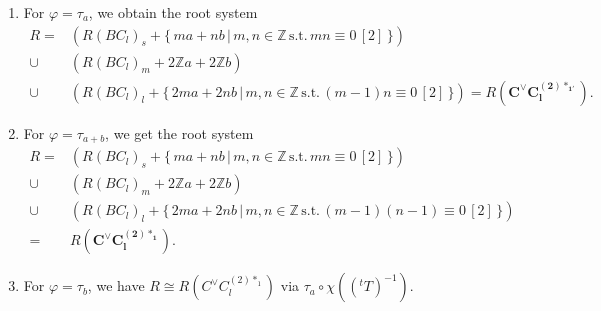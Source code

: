\documentclass[11pt]{amsart}
\newcommand{\Z}{\mathbb{Z}}
\begin{document}
\begin{enumerate}
\begin{enumerate}
\begin{align*}
R=
&(R(BC_l)_s+\{\, ma+nb\, \vert\, m,n \in \Z\, \text{s.t.}\, mn\equiv 0\, [2]\, \}) \\
\cup
&(R(BC_l)_m+2\Z a+2\Z b) \\
\cup
&(R(BC_l)_l+\{\, 2ma+2nb\, \vert\, m,n \in \Z\, \text{s.t.}\, mn\equiv 0\, [2]\, \})
= R(\mathbf{C^\vee C_l^{(2)\ast_0}}).
\end{align*}
\item[(ii)] For $\varphi=\tau_a$, we obtain the root system
\begin{align*}
R=
&(R(BC_l)_s+\{\, ma+nb\, \vert\, m,n \in \Z\, \text{s.t.}\, mn\equiv 0\, [2]\, \}) \\
\cup
&(R(BC_l)_m+2\Z a+2\Z b) \\
\cup
&(R(BC_l)_l+\{\, 2ma+2nb\, \vert\, m,n \in \Z\, \text{s.t.}\, (m-1)n\equiv 0\, [2]\, \})
= R(\mathbf{C^\vee C_l^{(2)\ast_{1'}}}).
\end{align*}
\item[(iii)] For $\varphi=\tau_{a+b}$, we get  the root system
\begin{align*}
R=
&(R(BC_l)_s+\{\, ma+nb\, \vert\, m,n \in \Z\, \text{s.t.}\, mn\equiv 0\, [2]\, \}) \\
\cup
&(R(BC_l)_m+2\Z a+2\Z b) \\
\cup
&(R(BC_l)_l+\{\, 2ma+2nb\, \vert\, m,n \in \Z\, \text{s.t.}\, (m-1)(n-1)\equiv 0\, [2]\, \}) \\
= 
&R(\mathbf{C^\vee C_l^{(2)\ast_1}}).
\end{align*}
\item[(iv)] For $\varphi=\tau_b$, we have $R\cong R(C^\vee C_l^{(2)\ast_1})$ via $\tau_a \circ \chi(({}^tT)^{-1})$. 
\end{enumerate}
\end{enumerate}
\vskip 0.2in 
\end{document}
